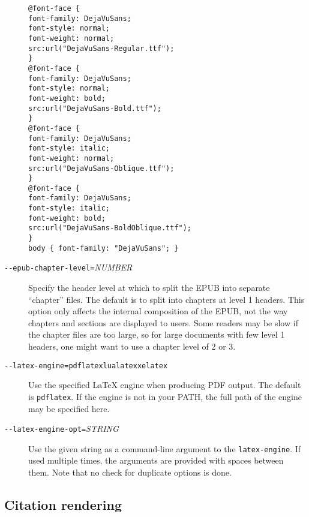 \documentclass[]{article}
\begin{document}
\begin{description}
\begin{verbatim}
@font-face {
font-family: DejaVuSans;
font-style: normal;
font-weight: normal;
src:url("DejaVuSans-Regular.ttf");
}
@font-face {
font-family: DejaVuSans;
font-style: normal;
font-weight: bold;
src:url("DejaVuSans-Bold.ttf");
}
@font-face {
font-family: DejaVuSans;
font-style: italic;
font-weight: normal;
src:url("DejaVuSans-Oblique.ttf");
}
@font-face {
font-family: DejaVuSans;
font-style: italic;
font-weight: bold;
src:url("DejaVuSans-BoldOblique.ttf");
}
body { font-family: "DejaVuSans"; }
\end{verbatim}
\item[\texttt{-\/-epub-chapter-level=}\emph{NUMBER}]
Specify the header level at which to split the EPUB into separate
``chapter'' files. The default is to split into chapters at level 1
headers. This option only affects the internal composition of the EPUB,
not the way chapters and sections are displayed to users. Some readers
may be slow if the chapter files are too large, so for large documents
with few level 1 headers, one might want to use a chapter level of 2 or
3.
\item[\texttt{-\/-latex-engine=pdflatex}\textbar{}\texttt{lualatex}\textbar{}\texttt{xelatex}]
Use the specified LaTeX engine when producing PDF output. The default is
\texttt{pdflatex}. If the engine is not in your PATH, the full path of
the engine may be specified here.
\item[\texttt{-\/-latex-engine-opt=}\emph{STRING}]
Use the given string as a command-line argument to the
\texttt{latex-engine}. If used multiple times, the arguments are
provided with spaces between them. Note that no check for duplicate
options is done.
\end{description}

\hypertarget{citation-rendering}{\subsection{Citation
rendering}\label{citation-rendering}}
\end{document}
